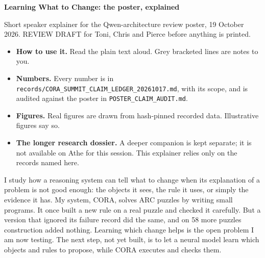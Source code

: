 \documentclass[11pt]{article}
\newcommand{\sub}[1]{\par\needspace{6\baselineskip}\vspace{0.5em}{\large\bfseries\color{accent}#1}\par}
\begin{document}
{\LARGE\bfseries Learning What to Change: the poster, explained\par}
\vspace{0.2em}
{\color{ink2} Short speaker explainer for the Qwen-architecture review poster, 19 October 2026. REVIEW DRAFT for
Toni, Chris and Pierce before anything is printed.\par}
\begin{itemize}
  \item \textbf{How to use it.} Read the plain text aloud. Grey bracketed lines are notes to you.
  \item \textbf{Numbers.} Every number is in \texttt{records/CORA\_SUMMIT\_CLAIM\_LEDGER\_20261017.md}, with its
        scope, and is audited against the poster in \texttt{POSTER\_CLAIM\_AUDIT.md}.
  \item \textbf{Figures.} Real figures are drawn from hash-pinned recorded data. Illustrative figures say so.
  \item \textbf{The longer research dossier.} A deeper companion is kept separate; it is not available on Athe for
        this session. This explainer relies only on the records named here.
\end{itemize}

\sub{The 20-second version}
I study how a reasoning system can tell what to change when its explanation of a problem is not good enough: the
objects it sees, the rule it uses, or simply the evidence it has. My system, CORA, solves ARC puzzles by writing small
programs. It once built a new rule on a real puzzle and checked it carefully. But a version that ignored its failure
record did the same, and on 58 more puzzles construction added nothing. Learning which change helps is the open
problem I am now testing. The next step, not yet built, is to let a neural model learn which objects and rules to
propose, while CORA executes and checks them.
\end{document}

